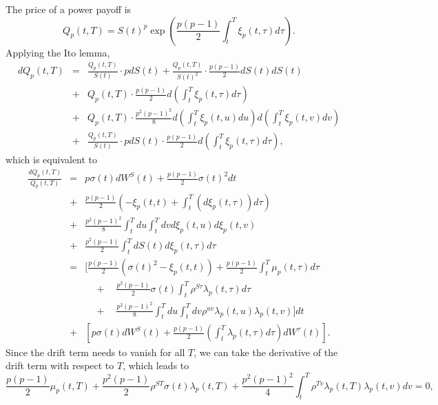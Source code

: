 \documentclass[12pt]{article}
\begin{document}
    The price of a power payoff is
    \begin{equation}
      Q_p(t,T)=S(t)^p\exp\left(\frac{p(p-1)}{2}\int_t^T\xi_p(t,\tau)d\tau\right).
    \end{equation}
    Applying the Ito lemma,
    \begin{eqnarray}
      dQ_p(t,T) &=& \frac{Q_p(t,T)}{S(t)}\cdot pdS(t) + \frac{Q_p(t,T)}{S(t)^2}\cdot\frac{p(p-1)}{2}dS(t)dS(t)\nonumber\\
                &+& Q_p(t,T)\cdot \frac{p(p-1)}{2} d\left(\int_t^T\xi_p(t,\tau)d\tau\right)\nonumber\\
                &+& Q_p(t,T)\cdot \frac{p^2(p-1)^2}{8} d\left(\int_t^T\xi_p(t,u)du\right)d\left(\int_t^T\xi_p(t,v)dv\right) \nonumber\\
                &+& \frac{Q_p(t,T)}{S(t)}\cdot pdS(t) \cdot \frac{p(p-1)}{2} d\left(\int_t^T\xi_p(t,\tau)d\tau\right),
    \end{eqnarray}
    which is equivalent to
    \begin{eqnarray}
      \frac{dQ_p(t,T)}{Q_p(t,T)}
                &=& p\sigma(t)dW^S(t) + \frac{p(p-1)}{2}\sigma(t)^2dt\nonumber\\
                &+& \frac{p(p-1)}{2}\left(-\xi_p(t,t) + \int_t^T\left(d\xi_p(t,\tau)\right)d\tau\right)\nonumber\\
                &+& \frac{p^2(p-1)^2}{8} \int_t^Tdu\int_t^Tdvd\xi_p(t,u)d\xi_p(t,v) \nonumber\\
                &+& \frac{p^2(p-1)}{2}\int_t^TdS(t)d\xi_p(t,\tau)d\tau \nonumber\\
                &=& \Bigg[\frac{p(p-1)}{2}\left(\sigma(t)^2 - \xi_p(t,t)\right) + \frac{p(p-1)}{2}\int_t^T \mu_p(t,\tau)d\tau \nonumber\\
                && \quad + \quad \frac{p^2(p-1)}{2}\sigma(t)\int_t^T\rho^{S\tau}\lambda_p(t,\tau)d\tau \nonumber\\
                && \quad + \quad \frac{p^2(p-1)^2}{8} \int_t^Tdu\int_t^Tdv\rho^{uv}\lambda_p(t,u)\lambda_p(t,v)\Bigg]dt\nonumber\\
                &+& \left[p\sigma(t)dW^S(t) + \frac{p(p-1)}{2}\left(\int_t^T\lambda_p(t,\tau)d\tau\right)dW^{\tau}(t)\right].
    \end{eqnarray}
    Since the drift term needs to vanish for all $T$, we can take the derivative of the drift term with respect to $T$, which leads to
    \begin{equation}
      \frac{p(p-1)}{2}\mu_p(t,T) + \frac{p^2(p-1)}{2}\rho^{ST}\sigma(t)\lambda_p(t,T)
           + \frac{p^2(p-1)^2}{4} \int_t^T\rho^{Tv}\lambda_p(t,T)\lambda_p(t,v)dv = 0,
    \end{equation}
\end{document}
